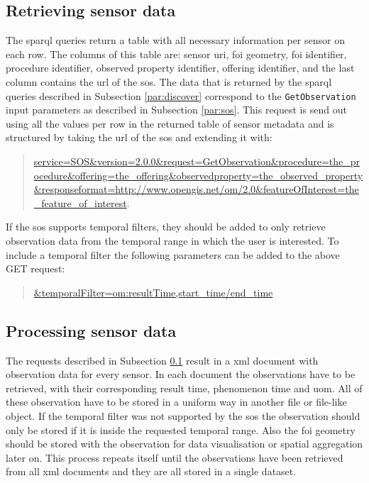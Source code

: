 \subsection{Retrieving sensor data}
\label{par:retrieve}
 The \ac{sparql} queries return a table with all necessary information per sensor on each row. The columns of this table are: sensor \ac{uri}, \ac{foi} geometry, \ac{foi} identifier, procedure identifier, observed property identifier, offering identifier, and the last column contains the \ac{url} of the \ac{sos}. The data that is returned by the \ac{sparql} queries described in Subsection \ref{par:discover} correspond to the \texttt{GetObservation} input parameters as described in Subsection \ref{par:sos}. This request is send out using all the values per row in the returned table of sensor metadata and is structured by taking the \ac{url} of the \ac{sos} and extending it with: 
 \begin{quote}
 	\url{service=SOS&version=2.0.0&request=GetObservation&procedure=the_procedure&offering=the_offering&observedproperty=the_observed_property&responseformat=http://www.opengis.net/om/2.0&featureOfInterest=the_feature_of_interest}. 
 \end{quote} 
 
 If the \ac{sos} supports temporal filters, they should be added to only retrieve observation data from the temporal range in which the user is interested. To include a temporal filter the following parameters can be added to the above GET request:
\begin{quote}
	\url{&temporalFilter=om:resultTime,start_time/end_time}
\end{quote} 


\subsection{Processing sensor data}
The requests described in Subsection \ref{par:retrieve} result in a \ac{xml} document with observation data for every sensor. In each document the observations have to be retrieved, with their corresponding result time, phenomenon time and \ac{uom}. All of these observation have to be stored in a uniform way in another file or file-like object. If the temporal filter was not supported by the \ac{sos} the observation should only be stored if it is inside the requested temporal range. Also the \ac{foi} geometry should be stored with the observation for data visualisation or spatial aggregation later on. This process repeats itself until the observations have been retrieved from all \ac{xml} documents and they are all stored in a single dataset.  

